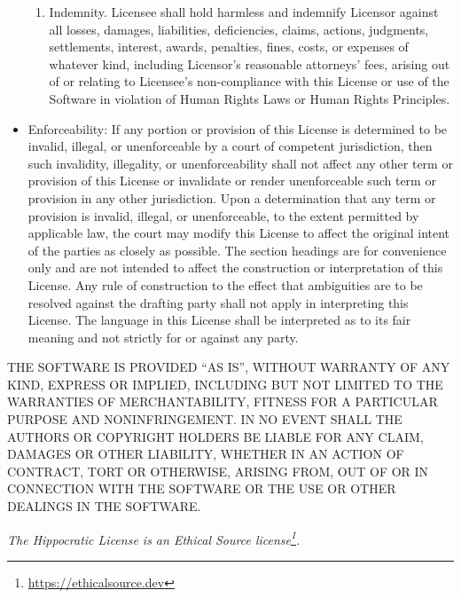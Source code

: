 \documentclass[krantzl]{krantz}
\newcommand{\hreffoot}[2]{{#1}\footnote{\href{#2}{#2}}}
\begin{document}
\begin{itemize}
\begin{enumerate}
\item 

Indemnity. Licensee shall hold harmless and indemnify Licensor against
    all losses, damages, liabilities, deficiencies, claims, actions,
    judgments, settlements, interest, awards, penalties, fines, costs, or
    expenses of whatever kind, including Licensor’s reasonable attorneys’
    fees, arising out of or relating to Licensee’s non-compliance with this
    License or use of the Software in violation of Human Rights Laws or
    Human Rights Principles.



\end{enumerate}



\item 

Enforceability: If any portion or provision of this License is determined to
     be invalid, illegal, or unenforceable by a court of competent jurisdiction,
     then such invalidity, illegality, or unenforceability shall not affect any
     other term or provision of this License or invalidate or render
     unenforceable such term or provision in any other jurisdiction. Upon a
     determination that any term or provision is invalid, illegal, or
     unenforceable, to the extent permitted by applicable law, the court may
     modify this License to affect the original intent of the parties as closely
     as possible. The section headings are for convenience only and are not
     intended to affect the construction or interpretation of this License. Any
     rule of construction to the effect that ambiguities are to be resolved
     against the drafting party shall not apply in interpreting this
     License. The language in this License shall be interpreted as to its fair
     meaning and not strictly for or against any party.



\end{itemize}


THE SOFTWARE IS PROVIDED “AS IS”, WITHOUT WARRANTY OF ANY KIND, EXPRESS OR
IMPLIED, INCLUDING BUT NOT LIMITED TO THE WARRANTIES OF MERCHANTABILITY, FITNESS
FOR A PARTICULAR PURPOSE AND NONINFRINGEMENT. IN NO EVENT SHALL THE AUTHORS OR
COPYRIGHT HOLDERS BE LIABLE FOR ANY CLAIM, DAMAGES OR OTHER LIABILITY, WHETHER
IN AN ACTION OF CONTRACT, TORT OR OTHERWISE, ARISING FROM, OUT OF OR IN
CONNECTION WITH THE SOFTWARE OR THE USE OR OTHER DEALINGS IN THE SOFTWARE.


\emph{The Hippocratic License is an \hreffoot{Ethical Source license}{https://ethicalsource.dev}.}
\end{document}
